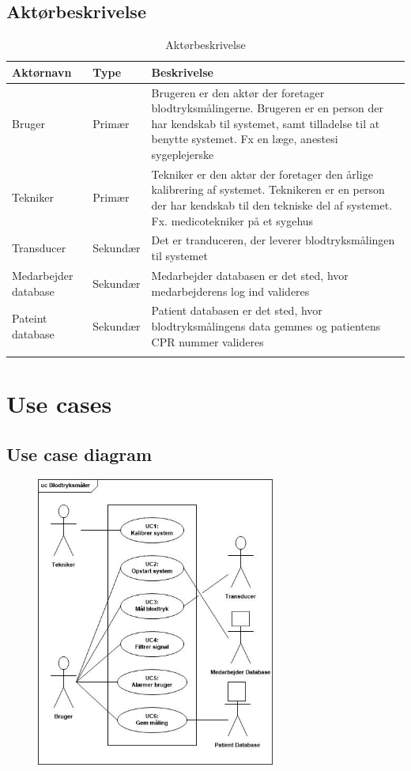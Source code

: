 \subsection{Aktørbeskrivelse}

\begin{longtabu}to 
	{\large \textbf{Aktørnavn}} & {\large \textbf{Type}} & {\large \textbf{Beskrivelse}}\\ \toprule
	Bruger & Primær & Brugeren er den aktør der foretager blodtryksmålingerne. Brugeren er en person der har kendskab til systemet, samt tilladelse til at benytte systemet. Fx en læge, anestesi sygeplejerske \\
	Tekniker & Primær & Tekniker er den aktør der foretager den årlige kalibrering af systemet. Teknikeren er en person der har kendskab til den tekniske del af systemet. Fx. medicotekniker på et sygehus\\
	Transducer & Sekundær & Det er tranduceren, der leverer blodtryksmålingen til systemet\\
	Medarbejder database & Sekundær & Medarbejder databasen er det sted, hvor medarbejderens log ind valideres \\
	Pateint database & Sekundær & Patient databasen er det sted, hvor blodtryksmålingens data gemmes og patientens CPR nummer valideres \\ \bottomrule
\caption{Aktørbeskrivelse}
\label{Aktoerbeskrivelse}
\end{longtabu}

\section{Use cases}
\subsection{Use case diagram}
\begin{figure}[H]
	\centering
	\includegraphics[width=0.7\textwidth]{Figurer/ISE/UseCaseDiagram}
\end{figure}

